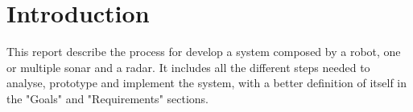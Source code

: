 \section{Introduction}
This report describe the process for develop a system composed by a robot, one or multiple sonar and a radar. It includes all the different steps needed to analyse, prototype and implement the system, with a better definition of itself in the "Goals" and "Requirements" sections.